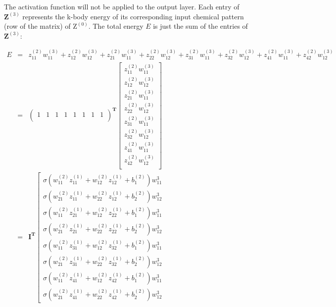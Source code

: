 \documentclass{article}
\begin{document}
\noindent The activation function will not be applied to the output layer.
Each entry of $\mathbf{Z}^{(3)}$ represents the k-body energy of its corresponding input 
chemical pattern (row of the matrix) of $\mathrm{Z}^{(0)}$.
The total energy $E$ is just the sum of the entries of $\mathbf{Z}^{(3)}$:

\begin{eqnarray}
E 
& = & 
z^{(2)}_{11}w^{(3)}_{11} + z^{(2)}_{12}w^{(3)}_{12} + 
z^{(2)}_{21}w^{(3)}_{11} + z^{(2)}_{22}w^{(3)}_{12} + 
z^{(2)}_{31}w^{(3)}_{11} + z^{(2)}_{32}w^{(3)}_{12} + 
z^{(2)}_{41}w^{(3)}_{11} + z^{(2)}_{42}w^{(3)}_{12} \nonumber \\
& = &
\left(\begin{array}{cccccccc}
	1 & 1 & 1 & 1 & 1 & 1 & 1 & 1 \\
\end{array}
\right)^\mathbf{T}
\left[\begin{array}{c}
	z^{(2)}_{11}w^{(3)}_{11} \\
	z^{(2)}_{12}w^{(3)}_{12} \\
	z^{(2)}_{21}w^{(3)}_{11} \\
	z^{(2)}_{22}w^{(3)}_{12} \\
	z^{(2)}_{31}w^{(3)}_{11} \\
	z^{(2)}_{32}w^{(3)}_{12} \\
	z^{(2)}_{41}w^{(3)}_{11} \\
	z^{(2)}_{42}w^{(3)}_{12} \\
\end{array}
\right] \nonumber \\
& = &
\mathbf{I}^\mathbf{T}
\left[\begin{array}{c}
	\sigma(w^{(2)}_{11}z^{(1)}_{11} + w^{(2)}_{12}z^{(1)}_{12} + b^{(2)}_1)w^3_{11} \\
	\sigma(w^{(2)}_{21}z^{(1)}_{11} + w^{(2)}_{22}z^{(1)}_{12} + b^{(2)}_2)w^3_{12} \\
	\sigma(w^{(2)}_{11}z^{(1)}_{21} + w^{(2)}_{12}z^{(1)}_{22} + b^{(2)}_1)w^3_{11} \\ 
	\sigma(w^{(2)}_{21}z^{(1)}_{21} + w^{(2)}_{22}z^{(1)}_{22} + b^{(2)}_2)w^3_{12} \\
	\sigma(w^{(2)}_{11}z^{(1)}_{31} + w^{(2)}_{12}z^{(1)}_{32} + b^{(2)}_1)w^3_{11} \\
	\sigma(w^{(2)}_{21}z^{(1)}_{31} + w^{(2)}_{22}z^{(1)}_{32} + b^{(2)}_2)w^3_{12} \\
	\sigma(w^{(2)}_{11}z^{(1)}_{41} + w^{(2)}_{12}z^{(1)}_{42} + b^{(2)}_1)w^3_{11} \\
	\sigma(w^{(2)}_{21}z^{(1)}_{41} + w^{(2)}_{22}z^{(1)}_{42} + b^{(2)}_2)w^3_{12}

\end{array}
\end{eqnarray}
\end{document}
